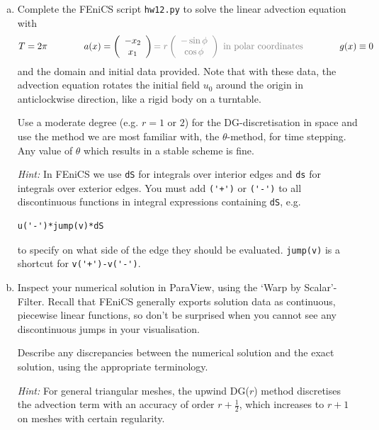 \begin{enumerate}[(a)]
\item Complete the \textsf{FEniCS} script \texttt{hw12.py} to solve the linear advection equation with
\begin{equation*}
T = 2\pi \qquad \qquad a(x) = \left(
\begin{array}{c}
-x_2\\ x_1
\end{array}
\right) \textcolor{gray}{ = r \left(
\begin{array}{c}
-\sin \phi \\ \cos \phi
\end{array}
\right)  \text{ in polar coordinates}}  \qquad \qquad  g(x) \equiv 0
\end{equation*}
and the domain and initial data provided. Note that with these data, the advection equation rotates the initial field $u_0$ around the origin in anticlockwise direction, like a rigid body on a turntable.

Use a moderate degree (e.g. $r=1$ or $2$) for the DG-discretisation in space and use the method we are most familiar with, the $\theta$-method, for time stepping. Any value of $\theta$ which results in a stable scheme is fine.

\emph{Hint:} In \textsf{FEniCS} we use \verb|dS| for integrals over interior edges and \verb|ds| for integrals over exterior edges. You must add \verb|('+')| or \verb|('-')| to all discontinuous functions in integral expressions containing \verb|dS|, e.g.
\begin{verbatim}
u('-')*jump(v)*dS
\end{verbatim}
to specify on what side of the edge they should be evaluated. \verb|jump(v)| is a shortcut for \verb|v('+')-v('-')|.

\item Inspect your numerical solution in \textsf{ParaView}, using the `Warp by Scalar'-Filter. Recall that \textsf{FEniCS} generally exports solution data as continuous, piecewise linear functions, so don't be surprised when you cannot see any discontinuous jumps in your visualisation.

Describe any discrepancies between the numerical solution and the exact solution, using the appropriate terminology.

\emph{Hint: } For general triangular meshes, the upwind DG($r$) method discretises the advection term with an accuracy of order $r+\frac{1}{2}$, which increases to $r+1$ on meshes with certain regularity.

\end{enumerate}

